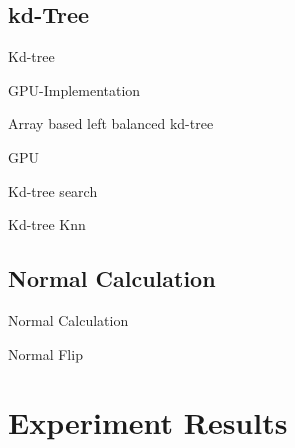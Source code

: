 \documentclass{beamer}
\begin{document}
\subsection*{kd-Tree}

\begin{frame}{Kd-tree}
 
\end{frame}

\begin{frame}{GPU-Implementation}
 
\end{frame}

\begin{frame}{Array based left balanced kd-tree}
 
\end{frame}

\begin{frame}{GPU}
 
\end{frame}

\begin{frame}{Kd-tree search}
 
\end{frame}

\begin{frame}{Kd-tree Knn}
 
\end{frame}

\subsection*{Normal Calculation}
\begin{frame}{Normal Calculation}
 
\end{frame}

\begin{frame}{Normal Flip}
 
\end{frame}

\section{Experiment Results}
\end{document}
